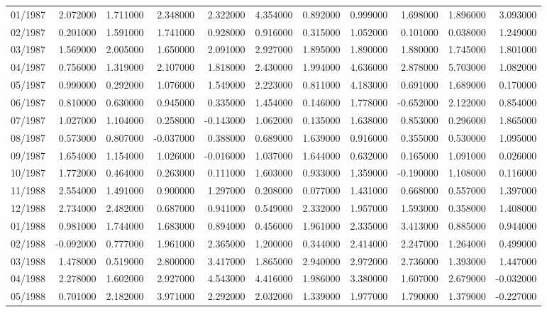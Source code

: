 \begin{tabular}{lrrrrrrrrrr}
01/1987 & 2.072000 & 1.711000 & 2.348000 & 2.322000 & 4.354000 & 0.892000 & 0.999000 & 1.698000 & 1.896000 & 3.093000 \\
02/1987 & 0.201000 & 1.591000 & 1.741000 & 0.928000 & 0.916000 & 0.315000 & 1.052000 & 0.101000 & 0.038000 & 1.249000 \\
03/1987 & 1.569000 & 2.005000 & 1.650000 & 2.091000 & 2.927000 & 1.895000 & 1.890000 & 1.880000 & 1.745000 & 1.801000 \\
04/1987 & 0.756000 & 1.319000 & 2.107000 & 1.818000 & 2.430000 & 1.994000 & 4.636000 & 2.878000 & 5.703000 & 1.082000 \\
05/1987 & 0.990000 & 0.292000 & 1.076000 & 1.549000 & 2.223000 & 0.811000 & 4.183000 & 0.691000 & 1.689000 & 0.170000 \\
06/1987 & 0.810000 & 0.630000 & 0.945000 & 0.335000 & 1.454000 & 0.146000 & 1.778000 & -0.652000 & 2.122000 & 0.854000 \\
07/1987 & 1.027000 & 1.104000 & 0.258000 & -0.143000 & 1.062000 & 0.135000 & 1.638000 & 0.853000 & 0.296000 & 1.865000 \\
08/1987 & 0.573000 & 0.807000 & -0.037000 & 0.388000 & 0.689000 & 1.639000 & 0.916000 & 0.355000 & 0.530000 & 1.095000 \\
09/1987 & 1.654000 & 1.154000 & 1.026000 & -0.016000 & 1.037000 & 1.644000 & 0.632000 & 0.165000 & 1.091000 & 0.026000 \\
10/1987 & 1.772000 & 0.464000 & 0.263000 & 0.111000 & 1.603000 & 0.933000 & 1.359000 & -0.190000 & 1.108000 & 0.116000 \\
11/1988 & 2.554000 & 1.491000 & 0.900000 & 1.297000 & 0.208000 & 0.077000 & 1.431000 & 0.668000 & 0.557000 & 1.397000 \\
12/1988 & 2.734000 & 2.482000 & 0.687000 & 0.941000 & 0.549000 & 2.332000 & 1.957000 & 1.593000 & 0.358000 & 1.408000 \\
01/1988 & 0.981000 & 1.744000 & 1.683000 & 0.894000 & 0.456000 & 1.961000 & 2.335000 & 3.413000 & 0.885000 & 0.944000 \\
02/1988 & -0.092000 & 0.777000 & 1.961000 & 2.365000 & 1.200000 & 0.344000 & 2.414000 & 2.247000 & 1.264000 & 0.499000 \\
03/1988 & 1.478000 & 0.519000 & 2.800000 & 3.417000 & 1.865000 & 2.940000 & 2.972000 & 2.736000 & 1.393000 & 1.447000 \\
04/1988 & 2.278000 & 1.602000 & 2.927000 & 4.543000 & 4.416000 & 1.986000 & 3.380000 & 1.607000 & 2.679000 & -0.032000 \\
05/1988 & 0.701000 & 2.182000 & 3.971000 & 2.292000 & 2.032000 & 1.339000 & 1.977000 & 1.790000 & 1.379000 & -0.227000 \\

\end{tabular}
